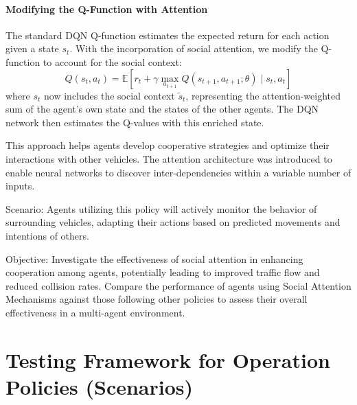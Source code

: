 \begin{enumerate}
\paragraph{Modifying the Q-Function with Attention} 
The standard DQN Q-function estimates the expected return for each action given a state $s_t$. With the incorporation of social attention, we modify the Q-function to account for the social context:
\[
Q(s_t, a_t) = \mathbb{E}\left[r_t + \gamma \max_{a_{t+1}} Q(s_{t+1}, a_{t+1}; \theta) \mid s_t, a_t\right]
\]
where $s_t$ now includes the social context $\tilde{s}_t$, representing the attention-weighted sum of the agent’s own state and the states of the other agents. The DQN network then estimates the Q-values with this enriched state.

    This approach helps agents develop cooperative strategies and optimize their interactions with other vehicles. 
    The attention architecture was introduced to enable neural networks to discover inter-dependencies within a variable number of inputs\cite{vaswani2017attention}.

    Scenario: Agents utilizing this policy will actively monitor the behavior of surrounding vehicles, adapting their actions based on predicted movements and intentions of others.

    Objective: Investigate the effectiveness of social attention in enhancing cooperation among agents, potentially leading to improved traffic flow and reduced collision rates. 
    Compare the performance of agents using Social Attention Mechanisms against those following other policies to assess their overall effectiveness in a multi-agent environment.
\end{enumerate}


\section{Testing Framework for Operation Policies (Scenarios)}

